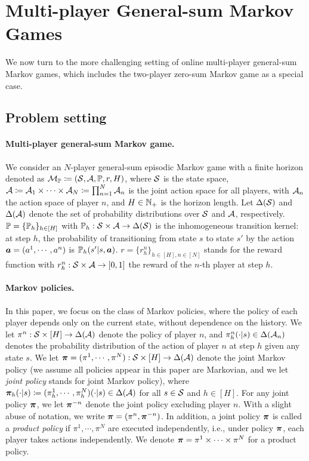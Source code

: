  

\section{Multi-player General-sum Markov Games}\label{sec:markov}
 
We now turn to the more challenging setting of online multi-player general-sum Markov games, which includes the two-player zero-sum Markov game as a special case. 

\subsection{Problem setting}\label{sec:markov_setting}



\paragraph{Multi-player general-sum Markov game.} We consider an $N$-player general-sum episodic Markov game with a finite horizon denoted as ${\mathcal{M}}_{\mathbb P}\coloneqq({\mathcal{S}},{\mathcal{A}},{\mathbb P}, r, H)$, where ${\mathcal{S}}$ is the state space, ${\mathcal{A}}\coloneqq{\mathcal{A}}_1\times\cdots\times{\mathcal{A}}_N\coloneqq\prod_{n=1}^{N} {\mathcal{A}}_n$ is the joint action space for all players, with ${\mathcal{A}}_n$  the action space of player $n$, and
$H\in{\mathbb N}_+$ is the horizon length. Let $\Delta({\mathcal{S}})$ and $\Delta({\mathcal{A}})$ denote the set of probability distributions over ${\mathcal{S}}$ and ${\mathcal{A}}$, respectively.  
${\mathbb P}=\{{\mathbb P}_h\}_{h\in[H]}$ with ${\mathbb P}_h:{\mathcal{S}}\times{\mathcal{A}}\rightarrow\Delta({\mathcal{S}})$ is the inhomogeneous transition kernel: at step $h$, the probability of transitioning from state $s$ to state $s'$ by the action ${\bm{a}}=(a^1,\cdots,a^n)$ is ${\mathbb P}_h(s'|s,{\bm{a}})$. $r =\{r_h^n\}_{h\in[H],n\in[N]}$ stands for the reward function with
$r_h^n:{\mathcal{S}}\times{\mathcal{A}}\rightarrow[0,1]$ the reward of the $n$-th player at step $h$.

\paragraph{Markov policies.} In this paper, we focus on the class of Markov policies, where the policy of each player depends only on the current state, without dependence on the history. We let $\pi^n:{\mathcal{S}}\times[H]\rightarrow \Delta({\mathcal{A}})$ denote the policy of player $n$, and $\pi^n_h(\cdot|s)\in\Delta({\mathcal{A}}_n)$ denotes the probability distribution of the action of player $n$ at step $h$ given any state $s$. 
We let ${\bm{\pi}}=(\pi^1,\cdots,\pi^N):{\mathcal{S}}\times[H]\rightarrow\Delta({\mathcal{A}})$ denote the joint Markov policy (we assume all policies appear in this paper are Markovian, and we let \textit{joint policy} stands for joint Markov policy), where ${\bm{\pi}}_h(\cdot|s)\coloneqq (\pi_h^1,\cdots,\pi_h^N)(\cdot|s)\in\Delta({\mathcal{A}})$ for all $s\in{\mathcal{S}}$ and $h\in[H]$.  
 For any joint policy ${\bm{\pi}}$, we let ${\bm{\pi}}^{-n}$ denote the joint policy excluding player $n$. With a slight abuse of notation, we write ${\bm{\pi}}=(\pi^n,{\bm{\pi}}^{-n})$. In addition, a joint policy ${\bm{\pi}}$ is called a \textit{product policy} if $\pi^1,\cdots,\pi^N$ are executed independently, i.e., under policy ${\bm{\pi}}$, each player takes actions independently. We denote ${\bm{\pi}} = \pi^1\times \cdots \times \pi^N$ for a product policy.
 



